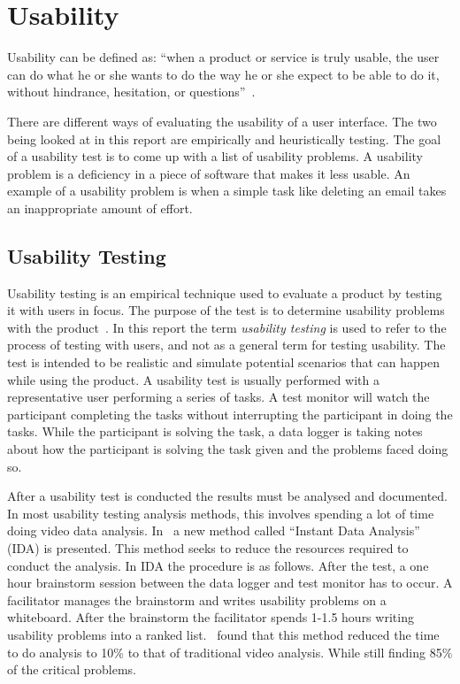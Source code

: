 \section{Usability}
\label{sub:usability}

Usability can be defined as: \enquote{when a product or service is truly usable, the user can do what he or she wants to do the way he or she expect to be able to do it, without hindrance, hesitation, or questions}~\cite{RubinChisnellSpool08}.

There are different ways of evaluating the usability of a user interface. The two being looked at in this report are empirically and heuristically testing. The goal of a usability test is to come up with a list of usability problems. A usability problem is a deficiency in a piece of software that makes it less usable. An example of a usability problem is when a simple task like deleting an email takes an inappropriate amount of effort.

\subsection{Usability Testing}
\label{sub:usabilityTesting}
Usability testing is an empirical technique used to evaluate a product by testing it with users in focus. The purpose of the test is to determine usability problems with the product~\cite{RubinChisnellSpool08}. In this report the term \emph{usability testing} is used to refer to the process of testing with users, and not as a general term for testing usability. The test is intended to be realistic and simulate potential scenarios that can happen while using the product. A usability test is usually performed with a representative user performing a series of tasks. A test monitor will watch the participant completing the tasks without interrupting the participant in doing the tasks. While the participant is solving the task, a data logger is taking notes about how the participant is solving the task given and the problems faced doing so.

After a usability test is conducted the results must be analysed and documented. In most usability testing analysis methods, this involves spending a lot of time doing video data analysis. In~\cite{kjeldskov2004instant} a new method called \enquote{Instant Data Analysis} (IDA) is presented. This method seeks to reduce the resources required to conduct the analysis. In IDA the procedure is as follows. After the test, a one hour brainstorm session between the data logger and test monitor has to occur. A facilitator  manages the brainstorm and writes usability problems on a whiteboard. After the brainstorm the facilitator spends 1-1.5 hours writing usability problems into a ranked list.~\cite{kjeldskov2004instant} found that this method reduced the time to do analysis to 10\% to that of traditional video analysis. While still finding 85\% of the critical problems.



